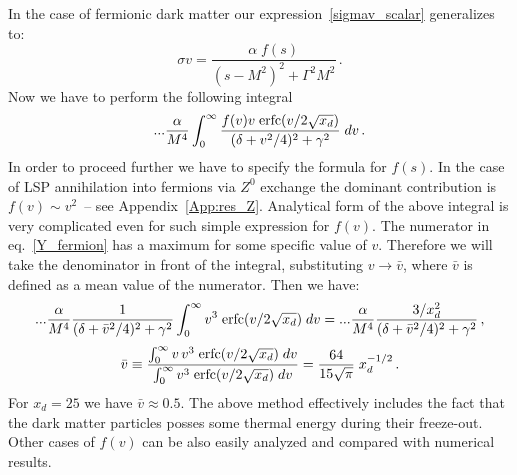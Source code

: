 \documentclass[12pt,twoside]{article}
\begin{document}
In the case of fermionic dark matter our expression~\ref{sigmav_scalar} generalizes to:
%
\begin{equation}
\label{sigmav_fermion}
\sigma v = \frac{\alpha\;f(s)}{(s-M^2)^2+\Gamma^2M^2}\,.
\end{equation}
%
Now we have to perform the following integral
%
\begin{equation}
\label{Y_fermion}
...\frac{\alpha}{M^4}
\int_0^\infty 
\frac{f(v)v\;{\rm erfc}(v/2\sqrt{x_d})}
{(\delta+v^2/4)^2+\gamma^2}\;dv\,.
\end{equation}
%
In order to proceed further we have to specify the formula for $f(s)$. In the case of LSP annihilation into fermions via $Z^0$ exchange the dominant contribution is $f(v)\sim v^2$~-- see Appendix~\ref{App:res_Z}. Analytical form of the above integral is very complicated even for such simple expression for $f(v)$. The numerator in eq.~\eqref{Y_fermion} has a maximum for some specific value of $v$. Therefore we will take the denominator in front of the integral, substituting $v\to\bar{v}$, where $\bar{v}$ is defined as a mean value of the numerator. Then we have:
%
\begin{equation}
\label{Y_fermion_app}
...\frac{\alpha}{M^4}
\frac{1}{(\delta+\bar{v}^2/4)^2+\gamma^2}
\int_0^\infty 
v^3\;{\rm erfc}(v/2\sqrt{x_d})
\;dv=
...\frac{\alpha}{M^4}
\frac{3/x_d^2}{(\delta+\bar{v}^2/4)^2+\gamma^2}
\,,
\end{equation}
%
\begin{equation}
\label{bar_v}
\bar{v}\equiv
\frac{\int_0^\infty v\,v^3\;{\rm erfc}(v/2\sqrt{x_d})\;dv}
{\int_0^\infty v^3\;{\rm erfc}(v/2\sqrt{x_d})\;dv}
=\frac{64}{15\sqrt{\pi}}\;x_d^{-1/2}\,.
\end{equation}
%
For $x_d=25$ we have $\bar{v}\approx 0.5$. The above method effectively includes the fact that the dark matter particles posses some thermal energy during their freeze-out. Other cases of $f(v)$ can be also easily analyzed and compared with numerical results.
\end{document}
